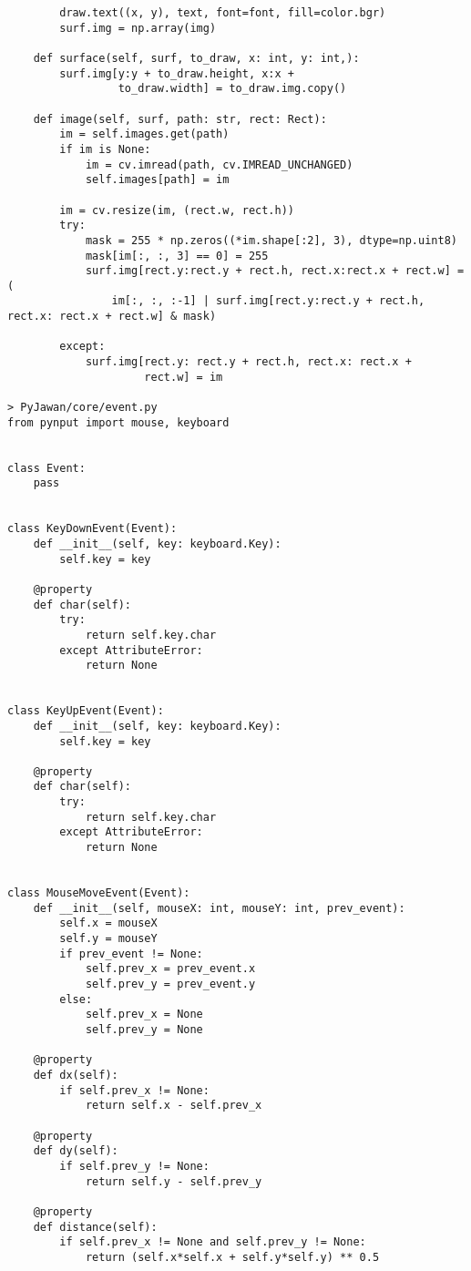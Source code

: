 \documentclass[11pt]{article}
\begin{document}
\begin{lstlisting}
        draw.text((x, y), text, font=font, fill=color.bgr)
        surf.img = np.array(img)

    def surface(self, surf, to_draw, x: int, y: int,):
        surf.img[y:y + to_draw.height, x:x +
                 to_draw.width] = to_draw.img.copy()

    def image(self, surf, path: str, rect: Rect):
        im = self.images.get(path)
        if im is None:
            im = cv.imread(path, cv.IMREAD_UNCHANGED)
            self.images[path] = im

        im = cv.resize(im, (rect.w, rect.h))
        try:
            mask = 255 * np.zeros((*im.shape[:2], 3), dtype=np.uint8)
            mask[im[:, :, 3] == 0] = 255
            surf.img[rect.y:rect.y + rect.h, rect.x:rect.x + rect.w] = (
                im[:, :, :-1] | surf.img[rect.y:rect.y + rect.h, rect.x: rect.x + rect.w] & mask)

        except:
            surf.img[rect.y: rect.y + rect.h, rect.x: rect.x +
                     rect.w] = im

> PyJawan/core/event.py
from pynput import mouse, keyboard


class Event:
    pass


class KeyDownEvent(Event):
    def __init__(self, key: keyboard.Key):
        self.key = key

    @property
    def char(self):
        try:
            return self.key.char
        except AttributeError:
            return None


class KeyUpEvent(Event):
    def __init__(self, key: keyboard.Key):
        self.key = key

    @property
    def char(self):
        try:
            return self.key.char
        except AttributeError:
            return None


class MouseMoveEvent(Event):
    def __init__(self, mouseX: int, mouseY: int, prev_event):
        self.x = mouseX
        self.y = mouseY
        if prev_event != None:
            self.prev_x = prev_event.x
            self.prev_y = prev_event.y
        else:
            self.prev_x = None
            self.prev_y = None

    @property
    def dx(self):
        if self.prev_x != None:
            return self.x - self.prev_x

    @property
    def dy(self):
        if self.prev_y != None:
            return self.y - self.prev_y

    @property
    def distance(self):
        if self.prev_x != None and self.prev_y != None:
            return (self.x*self.x + self.y*self.y) ** 0.5



\end{lstlisting}
\end{document}
